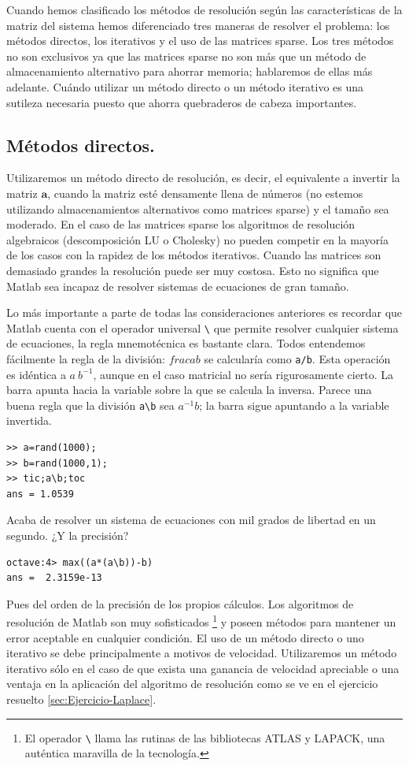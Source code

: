 Cuando hemos clasificado los métodos de resolución según las características
de la matriz del sistema hemos diferenciado tres maneras de resolver
el problema: los métodos directos, los iterativos y el uso de las
matrices sparse. Los tres métodos no son exclusivos ya que las matrices
sparse no son más que un método de almacenamiento alternativo para
ahorrar memoria; hablaremos de ellas más adelante. Cuándo utilizar
un método directo o un método iterativo es una sutileza necesaria
puesto que ahorra quebraderos de cabeza importantes.


\subsection{Métodos directos.}

Utilizaremos un método directo de resolución, es decir, el equivalente
a invertir la matriz $\mathbf{a}$, cuando la matriz esté densamente
llena de números (no estemos utilizando almacenamientos alternativos
como matrices sparse) y el tamaño sea moderado. En el caso de las
matrices sparse los algoritmos de resolución algebraicos
(descomposición LU o Cholesky) no pueden competir en la mayoría de los
casos con la rapidez de los métodos iterativos. Cuando las matrices
son demasiado grandes la resolución puede ser muy costosa. Esto no
significa que Matlab sea incapaz de resolver sistemas de ecuaciones de
gran tamaño.

Lo más importante a parte de todas las consideraciones anteriores es
recordar que Matlab cuenta con el operador universal
\texttt{\textbackslash{}} que permite resolver cualquier sistema de
ecuaciones, la regla mnemotécnica es bastante clara.  Todos entendemos
fácilmente la regla de la división: $frac{a}{b}$ se calcularía como
\texttt{a/b}.  Esta operación es idéntica a $a\ b^{-1}$, aunque en el
caso matricial no sería rigurosamente cierto.  La barra apunta hacia
la variable sobre la que se calcula la inversa.  Parece una buena
regla que la división \texttt{a\textbackslash{}b} sea $a^{-1}b$; la
barra sigue apuntando a la variable invertida.


\begin{verbatim}
>> a=rand(1000);
>> b=rand(1000,1);
>> tic;a\b;toc
ans = 1.0539
\end{verbatim}
Acaba de resolver un sistema de ecuaciones con mil grados de libertad
en un segundo. ¿Y la precisión?

\begin{verbatim}
octave:4> max((a*(a\b))-b)
ans =  2.3159e-13
\end{verbatim}
Pues del orden de la precisión de los propios cálculos. Los algoritmos
de resolución de Matlab son muy sofisticados%
\footnote{El operador \texttt{\textbackslash{}} llama las rutinas de
  las bibliotecas ATLAS y LAPACK, una auténtica maravilla de la
  tecnología.%
} y poseen métodos para mantener un error aceptable en cualquier
condición.  El uso de un método directo o uno iterativo se debe
principalmente a motivos de velocidad. Utilizaremos un método
iterativo sólo en el caso de que exista una ganancia de velocidad
apreciable o una ventaja en la aplicación del algoritmo de resolución
como se ve en el ejercicio resuelto \ref{sec:Ejercicio-Laplace}.


